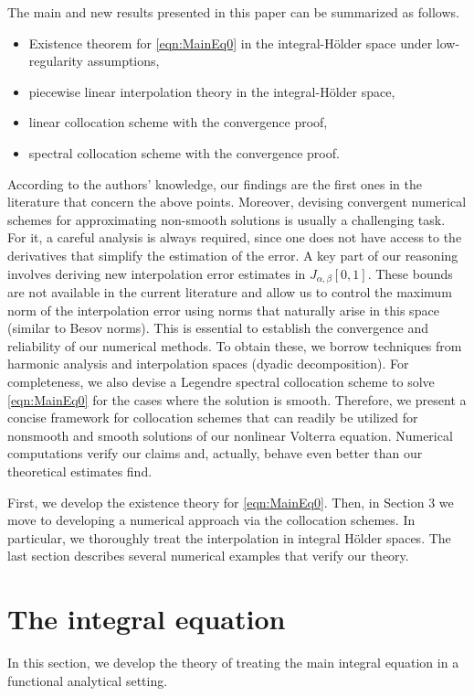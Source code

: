 \documentclass[12pt,a4paper]{article}
\begin{document}
The main and new results presented in this paper can be summarized as follows.
\begin{itemize}
	\item Existence theorem for \eqref{eqn:MainEq0} in the integral-H\"older space under low-regularity assumptions,
	\item piecewise linear interpolation theory in the integral-H\"older space,
	\item linear collocation scheme with the convergence proof,
	\item spectral collocation scheme with the convergence proof.
\end{itemize}
According to the authors' knowledge, our findings are the first ones in the literature that concern the above points. Moreover, devising convergent numerical schemes for approximating non-smooth solutions is usually a challenging task. For it, a careful analysis is always required, since one does not have access to the derivatives that simplify the estimation of the error. A key part of our reasoning involves deriving new interpolation error estimates in $J_{\alpha,\beta}[0,1]$. These bounds are not available in the current literature and allow us to control the maximum norm of the interpolation error using norms that naturally arise in this space (similar to Besov norms). This is essential to establish the convergence and reliability of our numerical methods. To obtain these, we borrow techniques from harmonic analysis and interpolation spaces (dyadic decomposition). For completeness, we also devise a Legendre spectral collocation scheme to solve \eqref{eqn:MainEq0} for the cases where the solution is smooth. Therefore, we present a concise framework for collocation schemes that can readily be utilized for nonsmooth and smooth solutions of our nonlinear Volterra equation. Numerical computations verify our claims and, actually, behave even better than our theoretical estimates find.  

First, we develop the existence theory for \eqref{eqn:MainEq0}. Then, in Section 3 we move to developing a numerical approach via the collocation schemes. In particular, we thoroughly treat the interpolation in integral H\"older spaces. The last section describes several numerical examples that verify our theory. 

\section{The integral equation}
In this section, we develop the theory of treating the main integral equation in a functional analytical setting. 
\end{document}
